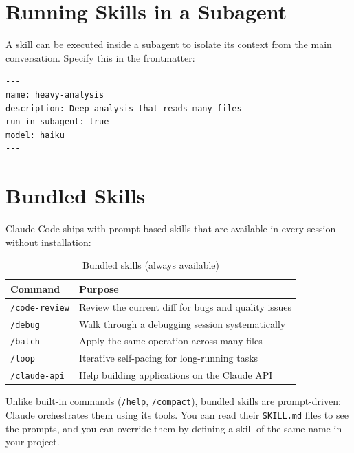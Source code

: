 \section{Running Skills in a Subagent}
\label{sec:skill-subagent}


A skill can be executed inside a subagent to isolate its context from the main
conversation. Specify this in the frontmatter:

\begin{lstlisting}[caption={Running a skill in a subagent (frontmatter option)}]
---
name: heavy-analysis
description: Deep analysis that reads many files
run-in-subagent: true
model: haiku
---
\end{lstlisting}

\section{Bundled Skills}
\label{sec:bundled-skills}


Claude Code ships with prompt-based skills that are available in every
session without installation:

\begin{table}[ht]
\centering
\caption{Bundled skills (always available)}
\label{tab:bundled-skills}
\begin{tabularx}{\textwidth}{lX}
\toprule
\textbf{Command} & \textbf{Purpose} \\
\midrule
\texttt{/code-review}  & Review the current diff for bugs and quality issues \\
\texttt{/debug}        & Walk through a debugging session systematically \\
\texttt{/batch}        & Apply the same operation across many files \\
\texttt{/loop}         & Iterative self-pacing for long-running tasks \\
\texttt{/claude-api}   & Help building applications on the Claude API \\
\bottomrule
\end{tabularx}
\end{table}

Unlike built-in commands (\texttt{/help}, \texttt{/compact}), bundled
skills are prompt-driven: Claude orchestrates them using its tools. You
can read their \texttt{SKILL.md} files to see the prompts, and you can
override them by defining a skill of the same name in your project.

